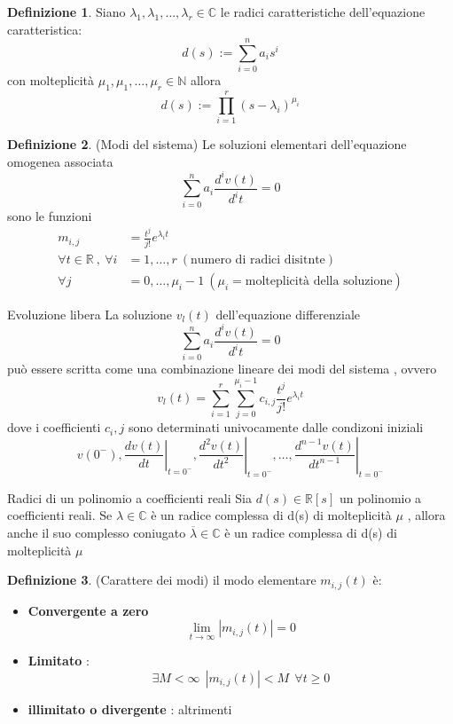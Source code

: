 \documentclass{article}
\theoremstyle{definition}
\newtheorem*{definizione}{Definizione}
\newcommand{\R}{\mathbb{R}}
\newcommand{\la}{\lambda}
\begin{document}
\begin{definizione}
Siano $\la_1,\la_1,\dots,\la_r\in \mathbb{C}$ le radici caratteristiche dell'equazione caratteristica:
	$$d(s):= \sum_{i=0}^{n}a_i s^i$$
	con molteplicità $\mu_1,\mu_1,\dots,\mu_r \in \mathbb{N}$ allora 
$$d(s):=\prod_{i=1}^{r}(s-\la_i)^{\mu_i}$$
\end{definizione}
\begin{definizione}(Modi del sistema)
	Le soluzioni elementari dell'equazione omogenea associata 
		$$\sum_{i=0}^{n}a_i \frac{d^i v(t)}{d^it}=0$$
	sono le funzioni 
	\begin{align*}
m_{i,j}&=\frac{t^j}{j!}e^{\la_i t}\\
\forall t \in \R  \ , \ \forall i&= 1,\dots,r\  (\text{numero di radici disitnte}) \\ 
\forall j&=0,\dots,\mu_i-1 \ (\mu_i= \text{molteplicità della soluzione})
\end{align*}	
\end{definizione}
\begin{teo}{Evoluzione libera}{}
	La soluzione $v_l(t)$ dell'equazione differenziale 
		$$\sum_{i=0}^{n}a_i \frac{d^i v(t)}{d^it}=0$$
		può essere scritta come una combinazione lineare dei modi del sistema , ovvero 
		$$v_l(t)=\sum_{i=1}^{r}\sum_{j=0}^{\mu_i-1}c_{i,j}\frac{t^j}{j!}e^{\la_i t}$$
		dove i coefficienti $c_i,j$ sono determinati univocamente dalle condizoni iniziali 
		$$v\left(0^{-}\right),\left.\frac{d v(t)}{d t}\right|_{t=0^{-}},\left.\frac{d^2 v(t)}{d t^2}\right|_{t=0^{-}}, \ldots,\left.\frac{d^{n-1} v(t)}{d t^{n-1}}\right|_{t=0^{-}}
		$$
\end{teo}
\begin{teo}{Radici di un polinomio a coefficienti reali}{}
	Sia $d(s)\in \R[s]$ un polinomio a coefficienti reali. Se $\la \in \mathbb{C}$ è un radice complessa di d(s) di molteplicità $\mu$ , allora anche il suo complesso coniugato $\overline{\la}\in \mathbb{C}$ è un radice complessa di d(s) di molteplicità $\mu$
\end{teo}
\begin{definizione}(Carattere dei modi)
il modo elementare $m_{i,j}(t)$ è: 
\begin{itemize}
	\item \textbf{Convergente a zero} 
	$$\lim_{t \rightarrow \infty} |m_{i,j}(t)|=0$$
	\item  \textbf{Limitato} :
	$$\exists M < \infty \ \  | m_{i,j}(t)|<M \ \ \forall t \geq 0$$
	\item \textbf{illimitato o divergente } : altrimenti  
\end{itemize}
\end{definizione}
\end{document}
